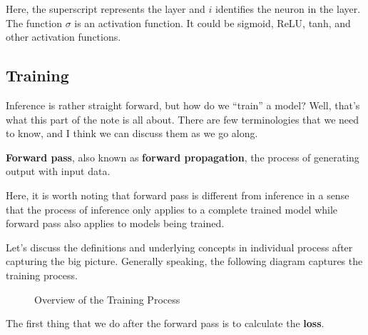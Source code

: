 \documentclass[../../../main.tex]{subfiles}
\begin{document}
Here, the superscript represents the layer and $i$ identifies the
neuron in the layer. The function $\sigma$ is an activation function.
It could be sigmoid, ReLU, tanh, and other activation functions.

\subsection{Training}

Inference is rather straight forward, but how do we ``train''
a model? Well, that's what this part of the note is all about.
There are few terminologies that we need to know, and I think
we can discuss them as we go along.

\begin{definition}{}{}
\textbf{Forward pass}, also known as \textbf{forward propagation},
the process of generating output with input data.
\end{definition}

Here, it is worth noting that forward pass is different from
inference in a sense that the process of inference only applies
to a complete trained model while forward pass also applies to
models being trained.

Let's discuss the definitions and underlying concepts in individual
process after capturing the big picture. Generally speaking,
the following diagram captures the training process.

\begin{figure}[H]
\centering
{}
\caption{Overview of the Training Process}
\end{figure}

The first thing that we do after the forward pass is to calculate
the \textbf{loss}.
\end{document}
